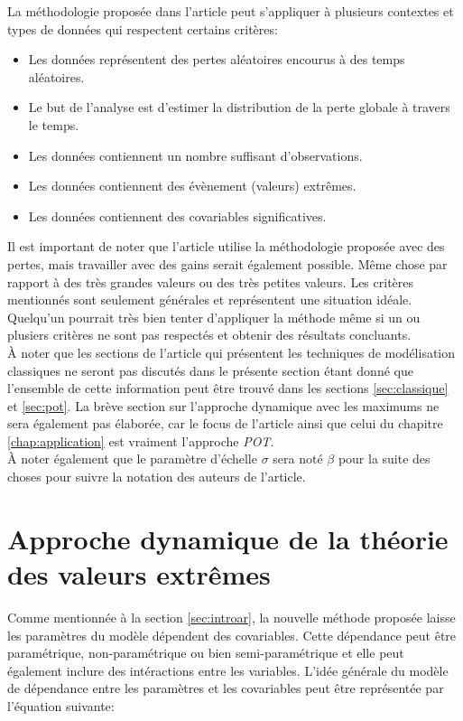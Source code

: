 La méthodologie proposée dans l'article peut s'appliquer à plusieurs contextes et types de données qui respectent certains critères:
\begin{itemize}
\item Les données représentent des pertes aléatoires encourus à des temps aléatoires.
\item Le but de l'analyse est d'estimer la distribution de la perte globale à travers le temps.
\item Les données contiennent un nombre suffisant d'observations.
\item Les données contiennent des évènement (valeurs) extrêmes.
\item Les données contiennent des covariables significatives.
\end{itemize}

Il est important de noter que l'article utilise la méthodologie proposée avec des pertes, mais travailler avec des gains serait également possible. Même chose par rapport à des très grandes valeurs ou des très petites valeurs. Les critères mentionnés sont seulement générales et représentent une situation idéale. Quelqu'un pourrait très bien tenter d'appliquer la méthode même si un ou plusiers critères ne sont pas respectés et obtenir des résultats concluants. 
\\

À noter que les sections de l'article qui présentent les techniques de modélisation classiques ne seront pas discutés dans le présente section étant donné que l'ensemble de cette information peut être trouvé dans les sections \ref{sec:classique} et \ref{sec:pot}. La brève section sur l'approche dynamique avec les maximums ne sera également pas élaborée, car le focus de l'article ainsi que celui du chapitre \ref{chap:application} est vraiment l'approche \textit{POT}. 
\\

À noter également que le paramètre d'échelle $\sigma$ sera noté $\beta$ pour la suite des choses pour suivre la notation des auteurs de l'article.

\section{Approche dynamique de la théorie des valeurs extrêmes}

Comme mentionnée à la section \ref{sec:introar}, la nouvelle méthode proposée laisse les paramètres du modèle dépendent des covariables. Cette dépendance peut être paramétrique, non-paramétrique ou bien semi-paramétrique et elle peut également inclure des intéractions entre les variables. L'idée générale du modèle de dépendance entre les paramètres et les covariables peut être représentée par l'équation suivante:

